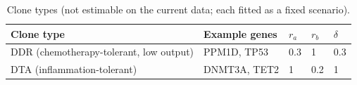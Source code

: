 \begin{table}[!htbp]
\centering
\small
\setlength{\tabcolsep}{3.5pt}
\caption{Clone types (not estimable on the current data; each fitted as a fixed scenario).}
\label{tab:clone}
\begin{tabular}{lllll}
\toprule
Clone type & Example genes & $r_a$ & $r_b$ & $\delta$ \\
\midrule
DDR (chemotherapy-tolerant, low output) & PPM1D, TP53 & 0.3 & 1 & 0.3 \\
DTA (inflammation-tolerant) & DNMT3A, TET2 & 1 & 0.2 & 1 \\
\bottomrule
\end{tabular}
\end{table}
